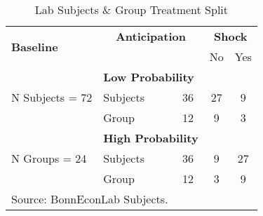 \begin{table}[H]
  \centering
  \caption{Lab Subjects \& Group Treatment Split}\label{tab:2}
  \begin{tabular}{llccc}
    \toprule
    \multirow{2}{*}{\textbf{Baseline}} & \multicolumn{2}{c}{\textbf{Anticipation}} & \multicolumn{2}{c}{\textbf{Shock}} \\ \cline{4-5}
                                    &         & & No & Yes \\
    \midrule
    \multirow{3}{*}{N Subjects = 72}& \multicolumn{2}{l}{\textbf{Low Probability}} \\ \cline{2-5}
                                    &Subjects & 36& 27 & 9 \\
                                    &Group    & 12 & 9 & 3 \\
                                    \cline{2-5}
    \multirow{3}{*}{N Groups = 24}& \multicolumn{2}{l}{\textbf{High Probability}} \\ \cline{2-5}
                                    &Subjects & 36& 9 & 27 \\
                                    &Group    & 12 & 3 & 9 \\
    \bottomrule
    \multicolumn{5}{l}{\footnotesize Source: BonnEconLab Subjects.}
  \end{tabular}
\end{table}
